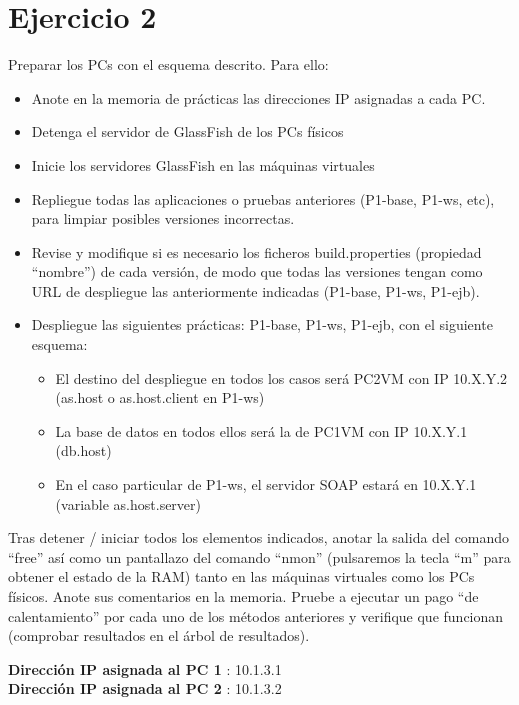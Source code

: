 \documentclass[a4paper, 10pt]{article}
\begin{document}
\section{Ejercicio 2}
\begin{mdframed} 
Preparar los PCs con el esquema descrito. Para ello:
\begin{itemize}
\item Anote en la memoria de prácticas las direcciones IP asignadas a cada PC. 
\item Detenga el servidor de GlassFish de los PCs físicos 
\item Inicie los servidores GlassFish en las máquinas virtuales 
\item Repliegue todas las aplicaciones o pruebas anteriores (P1-base, P1-ws, etc), para limpiar posibles 
versiones incorrectas. 
\item Revise y modifique si es necesario los ficheros build.properties (propiedad “nombre”) de cada 
versión, de modo que todas las versiones tengan como URL de despliegue las anteriormente 
indicadas (P1-base, P1-ws, P1-ejb). 
\item Despliegue las siguientes prácticas: P1-base, P1-ws, P1-ejb, con el siguiente esquema:
	\begin{itemize}
	\item El destino del despliegue en todos los casos será PC2VM con IP 10.X.Y.2 (as.host o 
as.host.client en P1-ws) 

	\item La base de datos en todos ellos será la de PC1VM con IP 10.X.Y.1 (db.host) 

	\item En el caso particular de P1-ws, el servidor SOAP estará en 10.X.Y.1 (variable 
as.host.server)

	\end{itemize}

\end{itemize}
Tras detener / iniciar todos los elementos indicados, anotar la salida del comando “free” así como un pantallazo del comando “nmon” (pulsaremos la tecla “m” para obtener el estado de la RAM) tanto en las máquinas virtuales como los PCs físicos. Anote sus comentarios en la memoria. 
Pruebe a ejecutar un pago “de calentamiento” por cada uno de los métodos anteriores y verifique que 
funcionan (comprobar resultados en el árbol de resultados). 
\end{mdframed}
 \textbf{Dirección IP asignada al PC 1} : 10.1.3.1 \\
 \textbf{Dirección IP asignada al PC 2} : 10.1.3.2 \\
\end{document}
